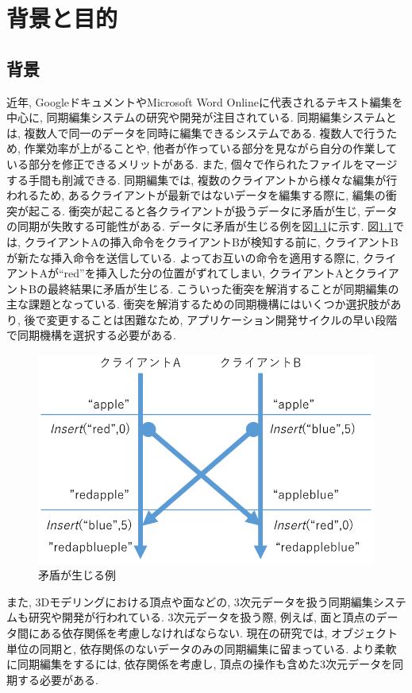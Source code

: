 \chapter{背景と目的}\label{chap:background}

\section{背景}
近年, GoogleドキュメントやMicrosoft Word Onlineに代表されるテキスト編集を中心に, 同期編集システムの研究や開発が注目されている. 同期編集システムとは, 複数人で同一のデータを同時に編集できるシステムである. 複数人で行うため, 作業効率が上がることや, 他者が作っている部分を見ながら自分の作業している部分を修正できるメリットがある. また, 個々で作られたファイルをマージする手間も削減できる. 同期編集では, 複数のクライアントから様々な編集が行われるため, あるクライアントが最新ではないデータを編集する際に, 編集の衝突が起こる. 衝突が起こると各クライアントが扱うデータに矛盾が生じ, データの同期が失敗する可能性がある. データに矛盾が生じる例を図\ref{mujyun}に示す. 図\ref{mujyun}では, クライアントAの挿入命令をクライアントBが検知する前に, クライアントBが新たな挿入命令を送信している. よってお互いの命令を適用する際に, クライアントAが``red''を挿入した分の位置がずれてしまい, クライアントAとクライアントBの最終結果に矛盾が生じる. こういった衝突を解消することが同期編集の主な課題となっている. 衝突を解消するための同期機構にはいくつか選択肢があり, 後で変更することは困難なため, アプリケーション開発サイクルの早い段階で同期機構を選択する必要がある.
\begin{figure}[htbp]
  \begin{center}
    \includegraphics[scale=0.5]{images/mujyun}
    \caption{矛盾が生じる例}
    \label{mujyun}
  \end{center}
\end{figure}
\par
また, 3Dモデリングにおける頂点や面などの, 3次元データを扱う同期編集システムも研究や開発が行われている. 3次元データを扱う際, 例えば, 面と頂点のデータ間にある依存関係を考慮しなければならない. 現在の研究では, オブジェクト単位の同期と, 依存関係のないデータのみの同期編集に留まっている. より柔軟に同期編集をするには, 依存関係を考慮し, 頂点の操作も含めた3次元データを同期する必要がある.

